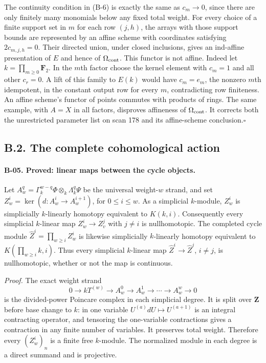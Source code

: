 The continuity condition in (B-6) is exactly the same as
$c_m\to0$, since there are only finitely many monomials below any
fixed total weight. For every choice of a finite support set in
$m$ for each row $(j,h)$, the arrays with those support bounds are
represented by an affine scheme with coordinates satisfying
$2c_{m,j,h}=0$. Their directed union, under closed inclusions, gives
an ind-affine presentation of $E$ and hence of $\Omega_{\rm cont}$.
This functor is not affine. Indeed let $k=\prod_{m\geq0}\mathbf F_2$.
In the $m$th factor choose the kernel element with $c_m=1$ and all
other $c_r=0$. A lift of this family to $E(k)$ would have
$c_m=e_m$, the nonzero $m$th idempotent, in the constant output row
for every $m$, contradicting row finiteness. An affine scheme's
functor of points commutes with products of rings. The same example,
with $A=X$ in all factors, disproves affineness of $\Omega_{\rm cont}$.
It corrects both the unrestricted parameter list on scan 178 and its
affine-scheme conclusion.\hfill$\square$

\subsection{B.2. The complete cohomological action}

\paragraph{B-05. Proved: linear maps between the cycle objects.}
Let $A_w^q=\Gamma_k^{w-q}\Phi\otimes_k\Lambda_k^q\Psi$
be the universal weight-$w$ strand, and set
$Z_w^i=\ker(d:A_w^i\to A_w^{i+1})$, for $0\leq i\leq w$.
As a simplicial $k$-module, $Z_w^i$ is simplicially $k$-linearly
homotopy equivalent to $K(k,i)$. Consequently every simplicial
$k$-linear map $Z_w^i\to Z_v^j$ with $j\ne i$ is nullhomotopic.
The completed cycle module
$\widehat Z^i=\prod_{w\geq i}Z_w^i$ is likewise simplicially
$k$-linearly homotopy equivalent to
$K(\prod_{w\geq i}k,i)$. Thus every simplicial $k$-linear map
$\widehat Z^i\to\widehat Z^j$, $i\ne j$, is nullhomotopic,
whether or not the map is continuous.

\emph{Proof.}
The exact weight strand
\[
 0\longrightarrow kT^{(w)}\longrightarrow A_w^0
 \longrightarrow A_w^1\longrightarrow\cdots
 \longrightarrow A_w^w\longrightarrow0
 \tag{B-8}
\]
is the divided-power Poincare complex in each simplicial degree.
It is split over $\mathbf Z$ before base change to $k$: in one
variable $U^{(a)}dU\mapsto U^{(a+1)}$ is an integral contracting
operator, and tensoring the one-variable contractions gives a
contraction in any finite number of variables. It preserves total
weight. Therefore every $(Z_w^i)_n$ is a finite free $k$-module.
The normalized module in each degree is a direct summand and is
projective.

